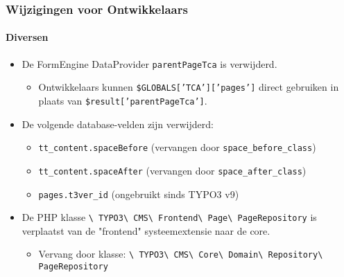 \begin{frame}[fragile]
	\frametitle{Wijzigingen voor Ontwikkelaars}
	\framesubtitle{Diversen}

	\begin{itemize}
		\item De FormEngine DataProvider \texttt{parentPageTca} is verwijderd.

			\begin{itemize}\smaller
				\item[\ding{228}] Ontwikkelaars kunnen \texttt{\$GLOBALS['TCA']['pages']} direct gebruiken in plaats van \texttt{\$result['parentPageTca']}.
			\end{itemize}\normalsize

		\item De volgende database-velden zijn verwijderd:

			\begin{itemize}\smaller
				\item \texttt{tt\_content.spaceBefore} (vervangen door \texttt{space\_before\_class})
				\item \texttt{tt\_content.spaceAfter} (vervangen door \texttt{space\_after\_class})
				\item \texttt{pages.t3ver\_id} (ongebruikt sinds TYPO3 v9)
			\end{itemize}\normalsize

		\item De PHP klasse
			\texttt{\textbackslash
				TYPO3\textbackslash
				CMS\textbackslash
				Frontend\textbackslash
				Page\textbackslash
				PageRepository} is verplaatst van de "frontend" systeemextensie naar de core.

			\begin{itemize}\smaller
				\item Vervang door klasse:
					\texttt{\textbackslash
						TYPO3\textbackslash
						CMS\textbackslash
						Core\textbackslash
						Domain\textbackslash
						Repository\textbackslash
						PageRepository}
			\end{itemize}\normalsize

	\end{itemize}

\end{frame}


